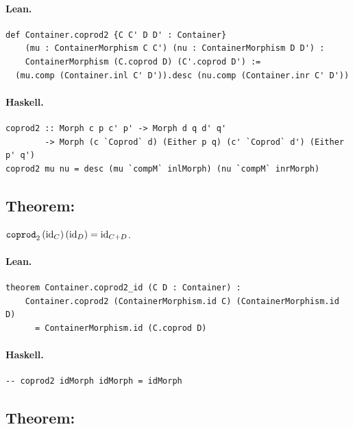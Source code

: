 \documentclass[11pt,a4paper]{article}
\begin{document}
\paragraph{Lean.}
\begin{lstlisting}[style=lean]
def Container.coprod2 {C C' D D' : Container}
    (mu : ContainerMorphism C C') (nu : ContainerMorphism D D') :
    ContainerMorphism (C.coprod D) (C'.coprod D') :=
  (mu.comp (Container.inl C' D')).desc (nu.comp (Container.inr C' D'))
\end{lstlisting}

\paragraph{Haskell.}
\begin{lstlisting}[style=haskell]
coprod2 :: Morph c p c' p' -> Morph d q d' q'
        -> Morph (c `Coprod` d) (Either p q) (c' `Coprod` d') (Either p' q')
coprod2 mu nu = desc (mu `compM` inlMorph) (nu `compM` inrMorph)
\end{lstlisting}


\subsection{Theorem: }

\begin{thm}
$\texttt{coprod}_2\,(\mathrm{id}_C)\,(\mathrm{id}_D) = \mathrm{id}_{C+D}$.
\end{thm}

\paragraph{Lean.}
\begin{lstlisting}[style=lean]
theorem Container.coprod2_id (C D : Container) :
    Container.coprod2 (ContainerMorphism.id C) (ContainerMorphism.id D)
      = ContainerMorphism.id (C.coprod D)
\end{lstlisting}

\paragraph{Haskell.}
\begin{lstlisting}[style=haskell]
-- coprod2 idMorph idMorph = idMorph
\end{lstlisting}


\subsection{Theorem: }
\end{document}
